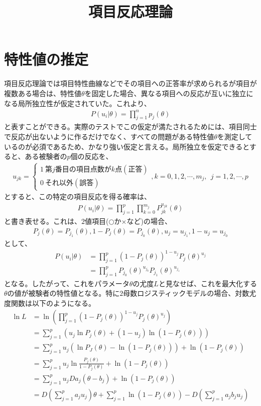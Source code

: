 \documentclass[12pt]{jarticle}
\title{項目反応理論}
\begin{document}
\maketitle
\section{特性値の推定}
項目反応理論では項目特性曲線などでその項目への正答率が求められるが項目が複数ある場合は、特性値$\theta$を固定した場合、異なる項目への反応が互いに独立になる局所独立性が仮定されていた。これより、
\begin{eqnarray}
  \label{00}
  \displaystyle P(u_{i}|\theta) =\prod_{j = 1}^{n} p_{j}(\theta)
\end{eqnarray}
と表すことができる。実際のテストでこの仮定が満たされるためには、項目同士で反応が出ないように作るだけでなく、すべての問題がある特性値$\theta$を測定しているのが必須であるため、かなり強い仮定と言える。局所独立を仮定できるとすると、ある被験者の$p$個の反応を、
\begin{eqnarray}
  \label{01}
  \displaystyle u_{jk} =\left\{\begin{array}{l}1 \ 第j番目の項目点数がk点(正答)\\ 0 \ それ以外(誤答)\end{array}\right.,k = 0,1,2,\cdots,m_{j}, \ \ j = 1,2,\cdots,p
\end{eqnarray}
とすると、この特定の項目反応を得る確率は、
\begin{eqnarray}
  \label{02}
  \displaystyle P(u_{i}|\theta) = \prod_{j = 1}^{p} \prod_{k = 0}^{m_j} P^{u_{jk}}_{jk}(\theta)
\end{eqnarray}
と書き表せる。これは、$2$値項目($\bigcirc$か$\times$など)の場合、
\begin{eqnarray}
  \label{03}
  \displaystyle P_{j}(\theta) = P_{j_1}(\theta),1 - P_j(\theta) = P_{j_0}(\theta),u_j = u_{j_1},1 - u_j = u_{j_0}
\end{eqnarray}
として、
\begin{align}
  \label{04}
  \displaystyle P(u_{i}|\theta) &= \prod_{j = 1}^{p} (1 - P_j(\theta))^{1 - u_j}P_j(\theta)^{u_j}\\
  &=\prod_{j = 1}^{p} P_{j_0}(\theta)^{u_{j_0}}P_{j_1}(\theta)^{u_{j_1}}
\end{align}
となる。したがって、これをパラメータ$\theta$の尤度$L$と見なせば、これを最大化する$\theta$の値が被験者の特性値となる。特に$2$母数ロジスティックモデルの場合、対数尤度関数は以下のようになる。
\begin{align*}
  \label{05}
  \displaystyle \ln L &= \ln \left(\prod_{j = 1}^{p} (1 - P_j(\theta))^{1 - u_j}P_j(\theta)^{u_j}\right)\\
  &= \sum_{j = 1}^{p} \left(u_j\ln P_j(\theta) + (1 - u_j)\ln(1 - P_j(\theta)) \right) \\
  &= \sum_{j = 1}^{p}  u_j(\ln P_J(\theta)- \ln (1 - P_j(\theta))) + \ln (1 - P_j(\theta)) \\
  &= \sum_{j = 1}^{p} u_j \ln \frac{P_j(\theta)}{1 - P_j(\theta)} + \ln(1-P_j(\theta)) \\
  &= \sum_{j = 1}^{p} u_j  Da_j(\theta - b_j) + \ln(1-P_j(\theta)) \\
  &= D(\sum_{j = 1}^{p}a_ju_j)\theta  + \sum_{j = 1}^{p} \ln (1 - P_j(\theta)) - D(\sum_{j = 1}^{p} a_jb_ju_j) \tag{7}
\end{align*}
\end{document}
